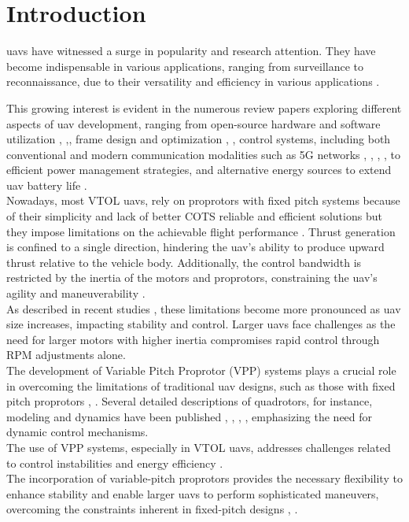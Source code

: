 \chapter{Introduction}
\label{chap:Chapter1}
\glspl{uav} have witnessed a surge in popularity and research attention.
They have become indispensable in various applications, ranging from surveillance to reconnaissance, due to their versatility and efficiency in various applications \cite{UAV1}.

This growing interest is evident in the numerous review papers exploring different aspects of \gls{uav} development, ranging from open-source hardware and software utilization \cite{UAV2}, \cite{UAV3},\cite{UAV4}, frame design and optimization \cite{UAV5}, \cite{UAV6}, control systems, including both conventional and modern communication modalities such as 5G networks \cite{UAV7}, \cite{UAV8}, \cite{UAV10}, \cite{UAV11}, to efficient power management strategies, and alternative energy sources to extend \gls{uav} battery life \cite{UAV15}.\\

Nowadays, most \gls{VTOL} \glspl{uav}, rely on proprotors with fixed pitch systems because of their simplicity and lack of better \gls{COTS} reliable and efficient solutions but they impose limitations on the achievable flight performance \cite{FPP1}.
Thrust generation is confined to a single direction, hindering the \gls{uav}'s ability to produce upward thrust relative to the vehicle body.
Additionally, the control bandwidth is restricted by the inertia of the motors and proprotors, constraining the \gls{uav}'s agility and maneuverability \cite{FPP1}.\\
As described in recent studies \cite{FPP1}, these limitations become more pronounced as \gls{uav} size increases, impacting stability and control.
Larger \glspl{uav} face challenges as the need for larger motors with higher inertia compromises rapid control through \gls{RPM} adjustments alone.\\

The development of Variable Pitch Proprotor (VPP) systems plays a crucial role in overcoming the limitations of traditional \gls{uav} designs, such as those with fixed pitch proprotors \cite{VPP1}, \cite{FPP1}.
Several detailed descriptions of quadrotors, for instance, modeling and dynamics have been published \cite{FPP2}, \cite{FPP3}, \cite{FPP4}, \cite{FPP5}, emphasizing the need for dynamic control mechanisms.\\
The use of VPP systems, especially in \gls{VTOL} \glspl{uav}, addresses challenges related to control instabilities and energy efficiency \cite{VPP1}.\\
The incorporation of variable-pitch proprotors provides the necessary flexibility to enhance stability and enable larger \glspl{uav} to perform sophisticated maneuvers, overcoming the constraints inherent in fixed-pitch designs \cite{VPP1}, \cite{FPP1}.

